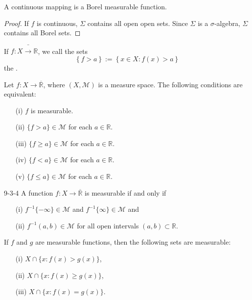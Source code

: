 \documentclass[../main.tex]{subfiles}
\begin{document}
\begin{corollary}{}{}
    A continuous mapping is a Borel measurable function.
\end{corollary}
\begin{proof}
   If \(  f  \) is continuous, \(   \Sigma   \) contains all open open sets. Since \(   \Sigma   \) is a \(   \sigma   \)-algebra, \(   \Sigma   \) contains all Borel sets.   
\end{proof}

\begin{definition}{}{}
    If \(  f: X\bar{\to}\mathbb{R}   \), we call the sets \[
    \left\{ f> a \right\}:= \left\{ x\in X:f\left( x \right)> a  \right\}
    \]the . 
\end{definition}

\begin{theorem}{}{}
Let $f: X \to \overline{\mathbb{R}}$, where $(X,\mathcal{M})$ is a measure space. The following conditions are equivalent:
\begin{enumerate}
\item[(i)] $f$ is measurable.
\item[(ii)] $\{f > a\} \in \mathcal{M}$ for each $a \in \mathbb{R}$.
\item[(iii)] $\{f \ge a\} \in \mathcal{M}$ for each $a \in \mathbb{R}$.
\item[(iv)] $\{f < a\} \in \mathcal{M}$ for each $a \in \mathbb{R}$.
\item[(v)] $\{f \le a\} \in \mathcal{M}$ for each $a \in \mathbb{R}$.
\end{enumerate}
\end{theorem}


\begin{theorem}{}{9-3-4}
A function $f: X \to \overline{\mathbb{R}}$ is measurable if and only if
\begin{enumerate}
    \item[(i)] $f^{-1}\{-\infty\} \in \mathcal{M}$ and $f^{-1}\{\infty\} \in \mathcal{M}$ and
    \item[(ii)] $f^{-1}(a,b) \in \mathcal{M}$ for all open intervals $(a,b) \subset \mathbb{R}$.
\end{enumerate}
\end{theorem}


\begin{lemma}{}{}
If $f$ and $g$ are measurable functions, then the following sets are measurable:
\begin{enumerate}
    \item[(i)] $X \cap \{x : f(x) > g(x)\}$,
    \item[(ii)] $X \cap \{x : f(x) \ge g(x)\}$,
    \item[(iii)] $X \cap \{x : f(x) = g(x)\}$.
\end{enumerate}
\end{lemma}
\end{document}
